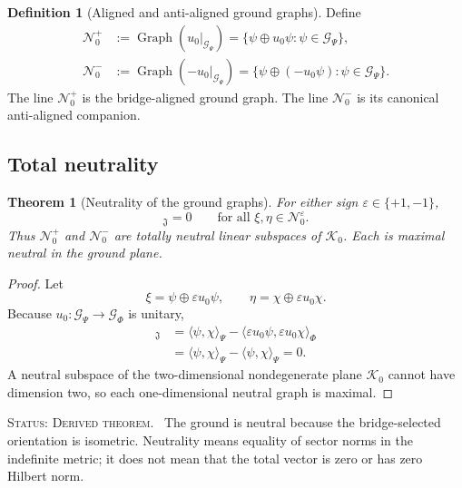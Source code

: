 \documentclass[11pt,reqno]{scrartcl}
\newcommand{\fundJ}{\mathfrak J}
\newcommand{\GzeroP}{\mathscr G_{\Psi}}
\newcommand{\GzeroF}{\mathscr G_{\Phi}}
\newcommand{\Kzero}{\mathscr K_{0}}
\newcommand{\uzero}{u_{0}}
\newcommand{\NzeroPlus}{\mathscr N_{0}^{+}}
\newcommand{\NzeroMinus}{\mathscr N_{0}^{-}}
\newcommand{\inner}[2]{\langle #1,#2\rangle}
\newcommand{\kInner}[2]{[#1,#2]_{\fundJ}}
\DeclareMathOperator{\Graph}{Graph}
\newcommand{\statuslabel}[1]{\par\smallskip\noindent\textsc{Status: #1.}\ }
\theoremstyle{plain}
\newtheorem{theorem}{Theorem}[section]
\theoremstyle{definition}
\newtheorem{definition}[definition]{Definition}
\theoremstyle{remark}
\begin{document}
\begin{definition}[Aligned and anti-aligned ground graphs]
\label{def:ground-graph-lines}
Define
\begin{align}
  \NzeroPlus
  &:=\Graph(\uzero|_{\GzeroP})
    =\{\psi\oplus\uzero\psi:\psi\in\GzeroP\},
  \label{eq:N0-plus-definition}\\
  \NzeroMinus
  &:=\Graph(-\uzero|_{\GzeroP})
    =\{\psi\oplus(-\uzero\psi):\psi\in\GzeroP\}.
  \label{eq:N0-minus-definition}
\end{align}
The line \(\NzeroPlus\) is the bridge-aligned ground graph.  The line
\(\NzeroMinus\) is its canonical anti-aligned companion.
\end{definition}

\subsection{Total neutrality}

\begin{theorem}[Neutrality of the ground graphs]
\label{thm:ground-graphs-neutral}
For either sign \(\varepsilon\in\{+1,-1\}\),
\begin{equation}
  \kInner{\xi}{\eta}=0
  \qquad
  \text{for all }\xi,\eta\in\mathscr N_0^{\varepsilon}.
  \label{eq:ground-total-neutrality}
\end{equation}
Thus \(\NzeroPlus\) and \(\NzeroMinus\) are totally neutral linear
subspaces of \(\Kzero\).  Each is maximal neutral in the ground plane.
\end{theorem}

\begin{proof}
Let
\begin{equation}
  \xi=\psi\oplus\varepsilon\uzero\psi,
  \qquad
  \eta=\chi\oplus\varepsilon\uzero\chi.
\end{equation}
Because \(\uzero:\GzeroP\to\GzeroF\) is unitary,
\begin{align}
  \kInner{\xi}{\eta}
  &=\inner{\psi}{\chi}_{\Psi}
    -\inner{\varepsilon\uzero\psi}{\varepsilon\uzero\chi}_{\Phi}\\
  &=\inner{\psi}{\chi}_{\Psi}-\inner{\psi}{\chi}_{\Psi}=0.
\end{align}
A neutral subspace of the two-dimensional nondegenerate plane \(\Kzero\)
cannot have dimension two, so each one-dimensional neutral graph is maximal.
\end{proof}

\statuslabel{Derived theorem} The ground is neutral because the bridge-selected
orientation is isometric.  Neutrality means equality of sector norms in the
indefinite metric; it does not mean that the total vector is zero or has zero
Hilbert norm.
\end{document}
